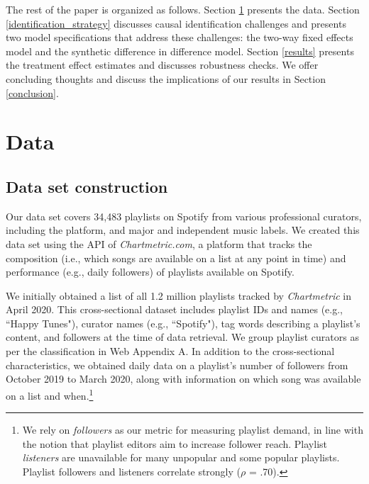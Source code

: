\documentclass[12pt, a4paper, leqno]{article}
\begin{document}
The rest of the paper is organized as follows. Section \ref{sec:data} presents the data. Section \ref{identification_strategy} discusses causal identification challenges and presents two model specifications that address these challenges: the two-way fixed effects model and the synthetic difference in difference model. Section \ref{results} presents the treatment effect estimates and discusses robustness checks. %
We offer concluding thoughts and discuss the implications of our results in Section \ref{conclusion}.


\section{Data} 
\label{sec:data}

\subsection{Data set construction}

Our data set covers 34,483 playlists on Spotify from various professional curators, including the platform, and major and independent music labels. We created this data set using the API of \textit{Chartmetric.com}, a platform that tracks the composition (i.e., which songs are available on a list at any point in time) and performance (e.g., daily followers) of playlists available on Spotify. 

We initially obtained a list of all 1.2 million playlists tracked by \textit{Chartmetric} in April 2020. This cross-sectional dataset includes playlist IDs and names (e.g., ``Happy Tunes"), curator names (e.g., ``Spotify"), tag words describing a playlist's content, and followers at the time of data retrieval. We group playlist curators as per the classification in Web Appendix A.
In addition to the cross-sectional characteristics, we obtained daily data on a playlist's number of followers from October 2019 to March 2020, along with information on which song was available on a list and when.\footnote{We rely on \textit{followers} as our metric for measuring playlist demand, in line with the notion that playlist editors aim to increase follower reach. Playlist \textit{listeners} are unavailable for many unpopular and some popular playlists. Playlist followers and listeners correlate strongly ($\rho$ = .70).} 
\end{document}
